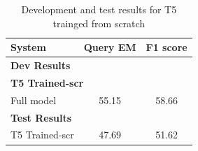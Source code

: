 \documentclass{article}
\begin{document}
\begin{table}[h]
\centering
\begin{tabular}{lcc}
  \toprule
  System & Query EM & F1 score\\
  \midrule
  \multicolumn{3}{l}{\textbf{Dev Results}} \\
  \midrule
  
  \multicolumn{3}{l}{\textbf{T5 Trained-scr}} \\
  Full model & 55.15 & 58.66 \\[5pt]
  
  \midrule
  \multicolumn{3}{l}{\textbf{Test Results}} \\
  \midrule
  T5 Trained-scr & 47.69 & 51.62 \\
  \bottomrule
\end{tabular}  
\caption{Development and test results for T5 trainged from scratch}
\label{tab:results}
\end{table}
\end{document}
